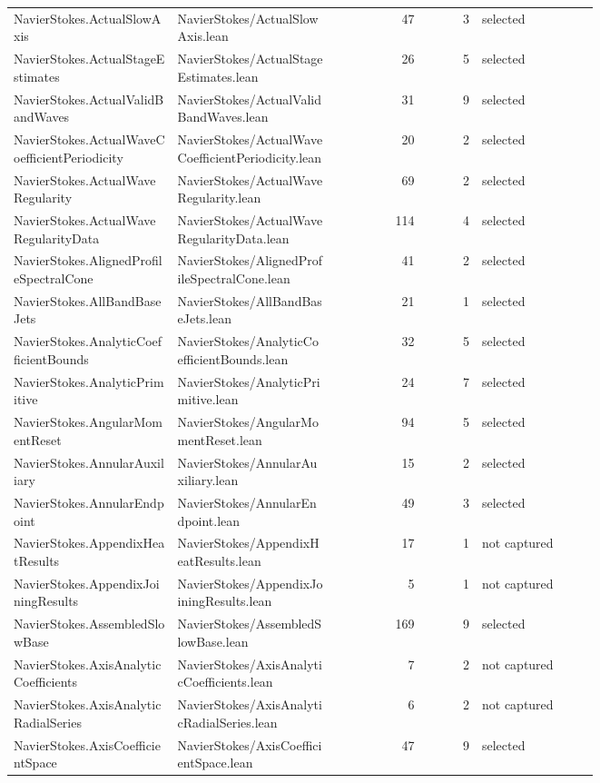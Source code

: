 \documentclass[10pt]{article}
\begin{document}
\begin{longtable}{p{0.28\linewidth}p{0.27\linewidth}r r p{0.20\linewidth}}
NavierStokes.ActualSlowAxis & NavierStokes/ActualSlowAxis.lean & 47 & 3 & selected\\
NavierStokes.ActualStageEstimates & NavierStokes/ActualStageEstimates.lean & 26 & 5 & selected\\
NavierStokes.ActualValidBandWaves & NavierStokes/ActualValidBandWaves.lean & 31 & 9 & selected\\
NavierStokes.ActualWaveCoefficientPeriodicity & NavierStokes/ActualWaveCoefficientPeriodicity.lean & 20 & 2 & selected\\
NavierStokes.ActualWaveRegularity & NavierStokes/ActualWaveRegularity.lean & 69 & 2 & selected\\
NavierStokes.ActualWaveRegularityData & NavierStokes/ActualWaveRegularityData.lean & 114 & 4 & selected\\
NavierStokes.AlignedProfileSpectralCone & NavierStokes/AlignedProfileSpectralCone.lean & 41 & 2 & selected\\
NavierStokes.AllBandBaseJets & NavierStokes/AllBandBaseJets.lean & 21 & 1 & selected\\
NavierStokes.AnalyticCoefficientBounds & NavierStokes/AnalyticCoefficientBounds.lean & 32 & 5 & selected\\
NavierStokes.AnalyticPrimitive & NavierStokes/AnalyticPrimitive.lean & 24 & 7 & selected\\
NavierStokes.AngularMomentReset & NavierStokes/AngularMomentReset.lean & 94 & 5 & selected\\
NavierStokes.AnnularAuxiliary & NavierStokes/AnnularAuxiliary.lean & 15 & 2 & selected\\
NavierStokes.AnnularEndpoint & NavierStokes/AnnularEndpoint.lean & 49 & 3 & selected\\
NavierStokes.AppendixHeatResults & NavierStokes/AppendixHeatResults.lean & 17 & 1 & not captured\\
NavierStokes.AppendixJoiningResults & NavierStokes/AppendixJoiningResults.lean & 5 & 1 & not captured\\
NavierStokes.AssembledSlowBase & NavierStokes/AssembledSlowBase.lean & 169 & 9 & selected\\
NavierStokes.AxisAnalyticCoefficients & NavierStokes/AxisAnalyticCoefficients.lean & 7 & 2 & not captured\\
NavierStokes.AxisAnalyticRadialSeries & NavierStokes/AxisAnalyticRadialSeries.lean & 6 & 2 & not captured\\
NavierStokes.AxisCoefficientSpace & NavierStokes/AxisCoefficientSpace.lean & 47 & 9 & selected\\

\end{longtable}
\end{document}
